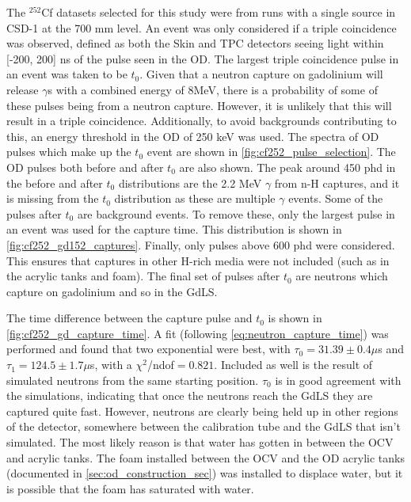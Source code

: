 \par
The ${}^{252}$Cf datasets selected for this study were from runs with a single source in CSD-1 at the 700 mm level.
An event was only considered if a triple coincidence was observed, defined as both the Skin and TPC detectors seeing light within [-200, 200] ns of the pulse seen in the OD.
The largest triple coincidence pulse in an event was taken to be $t_0$.
Given that a neutron capture on gadolinium will release $\gamma$s with a combined energy of 8MeV, there is a probability of some of these pulses being from a neutron capture.
However, it is unlikely that this will result in a triple coincidence.
Additionally, to avoid backgrounds contributing to this, an energy threshold in the OD of 250 keV was used.
The spectra of OD pulses which make up the $t_0$ event are shown in \autoref{fig:cf252_pulse_selection}.
The OD pulses both before and after $t_0$ are also shown.
The peak around 450 phd in the before and after $t_0$ distributions are the 2.2 MeV $\gamma$ from n-H captures, and it is missing from the $t_0$ distribution as these are multiple $\gamma$ events.
Some of the pulses after $t_0$ are background events.
To remove these, only the largest pulse in an event was used for the capture time.
This distribution is shown in \autoref{fig:cf252_gd152_captures}.
Finally, only pulses above 600 phd were considered.
This ensures that captures in other H-rich media were not included (such as in the acrylic tanks and foam).
The final set of pulses after $t_0$ are neutrons which capture on gadolinium and so in the GdLS.





\par
The time difference between the capture pulse and $t_0$ is shown in \autoref{fig:cf252_gd_capture_time}.
A fit (following \autoref{eq:neutron_capture_time}) was performed and found that two exponential were best, with $\tau_0 = 31.39 \pm 0.4\mu$s and $\tau_1 = 124.5 \pm 1.7\mu$s, with a $\chi^2$/ndof$=0.821$.
Included as well is the result of simulated neutrons from the same starting position.
$\tau_0$ is in good agreement with the simulations, indicating that once the neutrons reach the GdLS they are captured quite fast.
However, neutrons are clearly being held up in other regions of the detector, somewhere between the calibration tube and the GdLS that isn't simulated.
The most likely reason is that water has gotten in between the OCV and acrylic tanks.
The foam installed between the OCV and the OD acrylic tanks (documented in \autoref{sec:od_construction_sec}) was installed to displace water, but it is possible that the foam has saturated with water.

